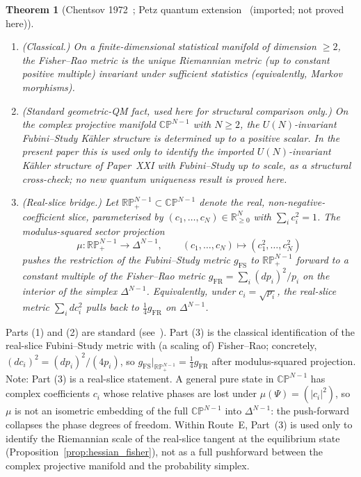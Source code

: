 \documentclass[12pt]{article}
\newtheorem{theorem}{Theorem}
\begin{document}
\begin{theorem}[Chentsov 1972~\citep{Chentsov1982}; Petz quantum extension~\citep{Petz1996} (imported; not proved here)]\label{thm:chentsov}
\begin{enumerate}
    \item (\emph{Classical.}) On a finite-dimensional statistical manifold of dimension $\geq 2$, the Fisher--Rao metric is the unique Riemannian metric (up to constant positive multiple) invariant under sufficient statistics (equivalently, Markov morphisms).
    \item (\emph{Standard geometric-QM fact, used here for structural comparison only.}) On the complex projective manifold $\mathbb{CP}^{N-1}$ with $N \geq 2$, the $U(N)$-invariant Fubini--Study K\"ahler structure is determined up to a positive scalar. In the present paper this is used only to identify the imported $U(N)$-invariant K\"ahler structure of Paper~XXI with Fubini--Study up to scale, as a structural cross-check; no new quantum uniqueness result is proved here.
    \item (\emph{Real-slice bridge.}) Let $\mathbb{RP}^{N-1}_+ \subset \mathbb{CP}^{N-1}$ denote the real, non-negative-coefficient slice, parameterised by $(c_1, \ldots, c_N) \in \mathbb{R}^N_{\geq 0}$ with $\sum_i c_i^2 = 1$. The modulus-squared sector projection
    \begin{equation}
        \mu: \mathbb{RP}^{N-1}_+ \to \Delta^{N-1}, \qquad (c_1, \ldots, c_N) \mapsto (c_1^2, \ldots, c_N^2)
    \end{equation}
    pushes the \emph{restriction} of the Fubini--Study metric $g_{\mathrm{FS}}$ to $\mathbb{RP}^{N-1}_+$ forward to a constant multiple of the Fisher--Rao metric $g_{\mathrm{FR}} = \sum_i (dp_i)^2/p_i$ on the interior of the simplex $\Delta^{N-1}$. Equivalently, under $c_i = \sqrt{p_i}$, the real-slice metric $\sum_i dc_i^2$ pulls back to $\tfrac14 g_{\mathrm{FR}}$ on $\Delta^{N-1}$.
\end{enumerate}
\end{theorem}

Parts (1) and (2) are standard (see~\citep{AmariNagaoka2000,Petz1996}). Part (3) is the classical identification of the real-slice Fubini--Study metric with (a scaling of) Fisher--Rao; concretely, $(dc_i)^2 = (dp_i)^2/(4 p_i)$, so $g_{\mathrm{FS}}|_{\mathbb{RP}^{N-1}_+} = \tfrac14 g_{\mathrm{FR}}$ after modulus-squared projection. Note: Part (3) is a real-slice statement. A general pure state in $\mathbb{CP}^{N-1}$ has complex coefficients $c_i$ whose relative phases are lost under $\mu(\Psi) = (|c_i|^2)$, so $\mu$ is not an isometric embedding of the full $\mathbb{CP}^{N-1}$ into $\Delta^{N-1}$: the push-forward collapses the phase degrees of freedom. Within Route~E, Part~(3) is used only to identify the Riemannian scale of the real-slice tangent at the equilibrium state (Proposition~\ref{prop:hessian_fisher}), not as a full pushforward between the complex projective manifold and the probability simplex.
\end{document}
